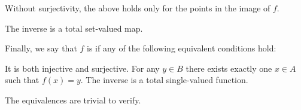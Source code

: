 \begin{definition}
\begin{thmenum}
\begin{minipage}[t]{0.44\textwidth}
\begin{thmenum}[leftmargin=0.9cm]
        Without surjectivity, the above holds only for the points in the image of \( f \).

         The inverse is a total set-valued map.
      \end{thmenum}
    \end{minipage}

     Finally, we say that \( f \) is  if any of the following equivalent conditions hold:
    \begin{thmenum}
       It is both injective and surjective.
       For any \( y \in B \) there exists exactly one \( x \in A \) such that \( f(x) = y \).
       The inverse is a total single-valued function.
    \end{thmenum}
  \end{thmenum}
\end{definition}
\begin{defproof}
  The equivalences are trivial to verify.
\end{defproof}


